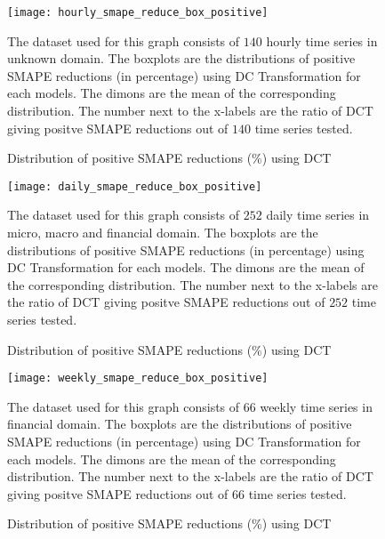 \begin{figure}
    \centering
    \texttt{[image: hourly\_smape\_reduce\_box\_positive]}
    \caption{Distribution of positive SMAPE reductions (\%) using DCT}
    {\raggedright \footnotesize The dataset used for this graph consists of $140$ hourly time series in unknown domain. The boxplots are the distributions of positive SMAPE reductions (in percentage) using DC Transformation for each models. The dimons are the mean of the corresponding distribution. The number next to the x-labels are the ratio of DCT giving positve SMAPE reductions out of $140$ time series tested.\par}
    \label{fig: hourly positive smape reduce box}
\end{figure}

\begin{figure}
    \centering
    \texttt{[image: daily\_smape\_reduce\_box\_positive]}
    \caption{Distribution of positive SMAPE reductions (\%) using DCT}
    {\raggedright \footnotesize The dataset used for this graph consists of $252$ daily time series in micro, macro and financial domain. The boxplots are the distributions of positive SMAPE reductions (in percentage) using DC Transformation for each models. The dimons are the mean of the corresponding distribution. The number next to the x-labels are the ratio of DCT giving positve SMAPE reductions out of $252$ time series tested.\par}
    \label{fig: daily positive smape reduce box}
\end{figure}

\begin{figure}
    \centering
    \texttt{[image: weekly\_smape\_reduce\_box\_positive]}
    \caption{Distribution of positive SMAPE reductions (\%) using DCT}
    {\raggedright \footnotesize The dataset used for this graph consists of $66$ weekly time series in financial domain. The boxplots are the distributions of positive SMAPE reductions (in percentage) using DC Transformation for each models. The dimons are the mean of the corresponding distribution. The number next to the x-labels are the ratio of DCT giving positve SMAPE reductions out of $66$ time series tested.\par}
    \label{fig: weekly positive smape reduce box}
\end{figure}




